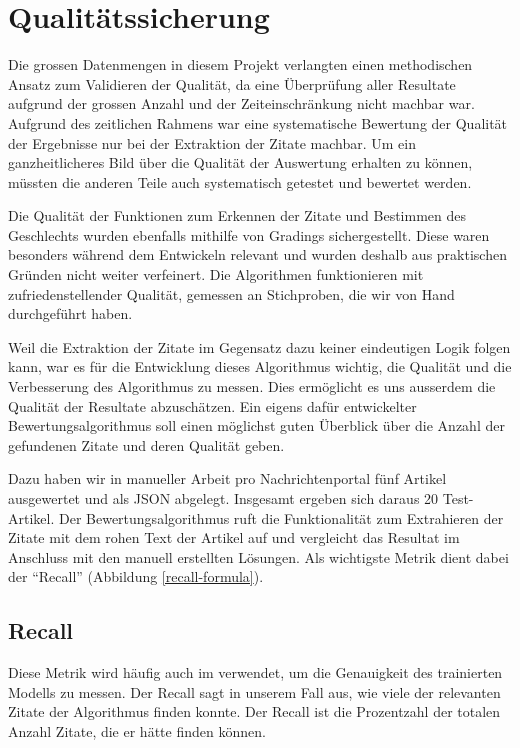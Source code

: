 \section{Qualitätssicherung}\label{quality-assurance}

Die grossen Datenmengen in diesem Projekt verlangten einen methodischen Ansatz zum Validieren der Qualität,
da eine Überprüfung aller Resultate aufgrund der grossen Anzahl und der Zeiteinschränkung nicht machbar war.
Aufgrund des zeitlichen Rahmens war eine systematische Bewertung der Qualität der Ergebnisse
nur bei der Extraktion der Zitate machbar.
Um ein ganzheitlicheres Bild über die Qualität der Auswertung erhalten zu können,
müssten die anderen Teile auch systematisch getestet und bewertet werden.

Die Qualität der Funktionen zum Erkennen der Zitate und Bestimmen des Geschlechts wurden ebenfalls mithilfe von
Gradings sichergestellt. Diese waren besonders während dem Entwickeln relevant und wurden deshalb aus praktischen Gründen
nicht weiter verfeinert. Die Algorithmen funktionieren mit zufriedenstellender Qualität, gemessen an Stichproben,
die wir von Hand durchgeführt haben.

Weil die Extraktion der Zitate im Gegensatz dazu keiner eindeutigen Logik folgen kann, war es für die Entwicklung dieses Algorithmus
wichtig, die Qualität und die Verbesserung des Algorithmus zu messen. Dies ermöglicht es uns ausserdem die Qualität
der Resultate abzuschätzen. 
Ein eigens dafür entwickelter Bewertungsalgorithmus soll einen möglichst guten Überblick über die Anzahl
der gefundenen Zitate und deren Qualität geben.

Dazu haben wir in manueller Arbeit pro Nachrichtenportal fünf Artikel ausgewertet und als JSON abgelegt. Insgesamt ergeben
sich daraus 20 Test-Artikel. Der Bewertungsalgorithmus ruft die Funktionalität zum Extrahieren der Zitate mit dem rohen
Text der Artikel auf und vergleicht das Resultat im Anschluss mit den manuell erstellten Lösungen. Als wichtigste Metrik
dient dabei der \enquote{Recall} (Abbildung \ref{recall-formula}).

\subsection{Recall}

Diese Metrik wird häufig auch im  verwendet, um die Genauigkeit des trainierten
Modells zu messen. Der Recall sagt in unserem Fall aus, wie viele der relevanten Zitate der Algorithmus finden konnte.
Der Recall ist die Prozentzahl der totalen Anzahl Zitate, die er hätte finden können.

